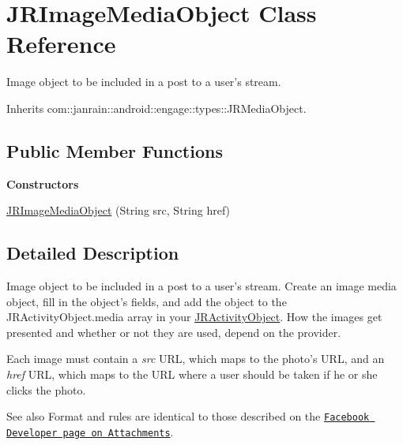 \hypertarget{classcom_1_1janrain_1_1android_1_1engage_1_1types_1_1_j_r_image_media_object}{
\section{JRImageMediaObject Class Reference}
\label{classcom_1_1janrain_1_1android_1_1engage_1_1types_1_1_j_r_image_media_object}
}


Image object to be included in a post to a user's stream.  




Inherits com::janrain::android::engage::types::JRMediaObject.

\subsection*{Public Member Functions}
\begin{Indent}{\bf Constructors}\par
{\em \label{_amgrp559a25fdb98a7d1fd1c3771ac568d5e9}
 }\begin{DoxyCompactItemize}
\item 
\hyperlink{classcom_1_1janrain_1_1android_1_1engage_1_1types_1_1_j_r_image_media_object_ad7f202d58a8adb7dc5ca477fb4eb2cf5}{JRImageMediaObject} (String src, String href)
\end{DoxyCompactItemize}
\end{Indent}


\subsection{Detailed Description}
Image object to be included in a post to a user's stream. Create an image media object, fill in the object's fields, and add the object to the JRActivityObject.media array in your \hyperlink{classcom_1_1janrain_1_1android_1_1engage_1_1types_1_1_j_r_activity_object}{JRActivityObject}. How the images get presented and whether or not they are used, depend on the provider.

Each image must contain a {\itshape src\/} URL, which maps to the photo's URL, and an {\itshape href\/} URL, which maps to the URL where a user should be taken if he or she clicks the photo.

\begin{DoxySeeAlso}{See also}
Format and rules are identical to those described on the \href{http://developers.facebook.com/docs/guides/attachments}{\tt Facebook Developer page on Attachments}. 
\end{DoxySeeAlso}


